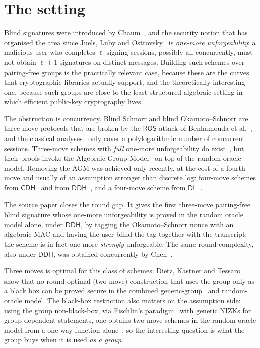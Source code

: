 \documentclass{aicr-conjecture}
\newcommand{\DL}{\mathsf{DL}}
\newcommand{\DDH}{\mathsf{DDH}}
\newcommand{\CDH}{\mathsf{CDH}}
\newcommand{\ROSassm}{\mathsf{ROS}}
\begin{document}
\section{The setting}\label{sec:setting}

Blind signatures were introduced by Chaum~\cite{Cha82}, and the security
notion that has organised the area since Juels, Luby and
Ostrovsky~\cite{JLO97} is \emph{one-more unforgeability}: a malicious user
who completes $\ell$ signing sessions, possibly all concurrently, must not
obtain $\ell + 1$ signatures on distinct messages. Building such schemes
over pairing-free groups is the practically relevant case, because these
are the curves that cryptographic libraries actually support, and the
theoretically interesting one, because such groups are close to the least
structured algebraic setting in which efficient public-key cryptography
lives.

The obstruction is concurrency. Blind Schnorr and blind Okamoto--Schnorr
are three-move protocols that are broken by the $\ROSassm$ attack of
Benhamouda et al.~\cite{BLL21}, and the classical analyses~\cite{PS00}
only cover a polylogarithmic number of concurrent sessions. Three-move
schemes with \emph{full} one-more unforgeability do exist~\cite{Abe01,TZ22},
but their proofs invoke the Algebraic Group Model~\cite{FKL18} on top of
the random oracle model. Removing the AGM was achieved only recently, at
the cost of a fourth move and usually of an assumption stronger than
discrete log: four-move schemes from $\CDH$~\cite{CATZ24} and from
$\DDH$~\cite{KR25}, and a four-move scheme from $\DL$~\cite{KLR25}.

The source paper closes the round gap. It gives the first three-move
pairing-free blind signature whose one-more unforgeability is proved in
the random oracle model alone, under $\DDH$, by tagging the
Okamoto--Schnorr nonce with an algebraic MAC and having the user blind the
tag together with the transcript; the scheme is in fact one-more
\emph{strongly} unforgeable. The same round complexity, also under $\DDH$,
was obtained concurrently by Chen~\cite{Che26}.

Three moves is optimal for this class of schemes: Dietz, Kastner and
Tessaro~\cite{DKT26} show that no round-optimal (two-move) construction
that uses the group only as a black box can be proved secure in the
combined generic-group~\cite{Sho97,Mau05} and random-oracle model. The
black-box restriction also matters on the assumption side: using the group
non-black-box, via Fischlin's paradigm~\cite{Fis06} with generic NIZKs for
group-dependent statements, one obtains two-move schemes in the random
oracle model from a one-way function alone~\cite{CMV26}, so the
interesting question is what the group buys when it is used \emph{as a
group}.
\end{document}
